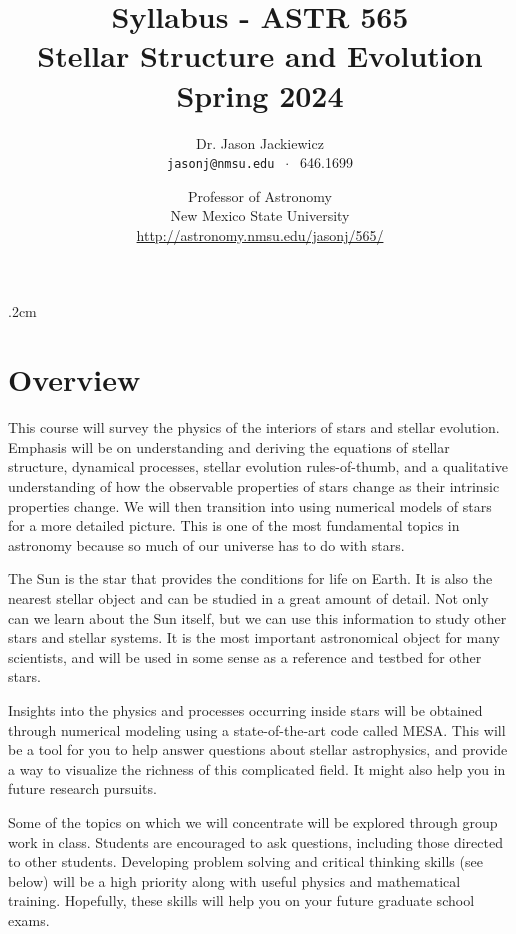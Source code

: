 \documentclass[10pt,letterpaper]{article}
\title{Syllabus - ASTR 565\\Stellar Structure and Evolution\\Spring 2024}
\author{Dr. Jason Jackiewicz\\\texttt{jasonj@nmsu.edu}  $\;\cdot\;$ 646.1699}
\date{Professor of Astronomy\\New Mexico  State University\\\vspace{.25cm}\url{http://astronomy.nmsu.edu/jasonj/565/}}
\begin{document}
\maketitle
\thispagestyle{empty}
\parindent 0cm
\parskip .2cm


\section{Overview}


This course will survey the physics of the interiors of stars and stellar evolution. Emphasis will be on understanding and deriving the equations of stellar structure, dynamical processes, stellar  evolution rules-of-thumb, and a qualitative understanding of how the observable properties of stars change as their intrinsic properties change.  We will then transition into using numerical models of stars for a more detailed picture. This is one of the most fundamental topics in astronomy because so much of our universe has to do with stars.

The Sun is the star that provides the conditions for life on Earth. It is also the nearest stellar object and can be studied in a great amount of detail. Not only can we learn about the Sun itself, but we can use this information to study other stars and stellar systems. It is the most important astronomical object for many scientists, and will be used in some sense as a reference and testbed for other stars.


Insights into the physics and processes occurring inside stars will be obtained through numerical modeling using a state-of-the-art code called MESA. This will be a tool for you to help answer questions about stellar astrophysics, and provide a way to visualize the richness of this complicated field. It might also help you in future research pursuits.

Some of the topics on which we will concentrate will be explored through group work in class. Students are encouraged to ask questions, including those directed to other students.  Developing problem solving and critical thinking skills (see below) will be a high priority along with useful physics and mathematical training. Hopefully, these skills will help you on your future graduate school exams.
\end{document}
